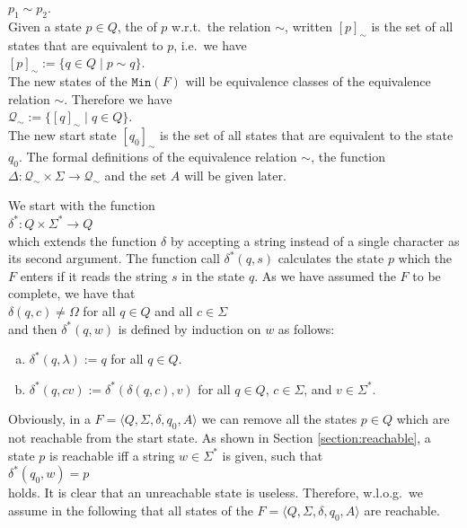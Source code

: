 $p_1 \sim p_2$.
\\[0.2cm]
Given a state $p \in Q$, the  of $p$ w.r.t.~the relation $\sim$, written $[p]_\sim$ is the set of all states that
are equivalent to $p$, i.e.~we have
\\[0.2cm]
\hspace*{1.3cm}
$[p]_\sim := \{ q \in Q \mid p \sim q \}$.
\\[0.2cm]
The new states of the  $\texttt{Min}(F)$ will be equivalence classes of the equivalence relation
$\sim$.  Therefore we have
\\[0.2cm]
\hspace*{1.3cm}
$\mathcal{Q}_\sim := \bigl\{ [q]_\sim \;\big|\; q \in Q \bigr\}$.
\\[0.2cm]
The new start state $[q_0]_\sim$ is the set of all states that are equivalent to the state $q_0$.  The formal definitions of the
equivalence relation $\sim$, the function $\Delta: \mathcal{Q}_\sim \times \Sigma \rightarrow \mathcal{Q}_\sim$
and the set $\widehat{A}$ will be given later.

We start with the function 
\\[0.2cm]
\hspace*{1.3cm}
$\delta^*: Q \times \Sigma^* \rightarrow Q$
\\[0.2cm]
which extends the function $\delta$ by accepting a string instead of a single character as its second argument.
The function call $\delta^*(q,s)$ calculates the state $p$ which the  $F$ enters if it reads the
string $s$ in the state $q$. As we have assumed the  $F$ to be complete, we have that
\\[0.2cm]
\hspace*{1.3cm}
$\delta(q, c) \not= \Omega$ \quad for all $q \in Q$ and all $c \in \Sigma$ 
\\[0.2cm]
and then $\delta^*(q,w)$ is defined by induction on $w$ as follows:
\begin{enumerate}[(a)]
\item $\delta^*(q, \lambda) := q$ \quad for all $q \in Q$.
\item $\delta^*(q, cv) := \delta^*(\delta(q, c), v)$ \quad for all $q \in Q$, $c \in \Sigma$, and $v \in \Sigma^*$.
\end{enumerate}

Obviously, in a 
$F = \langle Q, \Sigma, \delta, q_0, A \rangle$ we can remove all the states $p \in Q$ which are not
reachable from the start state.  As shown in Section \ref{section:reachable}, a state $p$ is reachable iff
a string $w \in \Sigma^*$ is given, such that
\\[0.2cm]
\hspace*{1.3cm}
$\delta^*(q_0, w) = p$
\\[0.2cm]
holds.  It is clear that an unreachable state is useless.  Therefore, w.l.o.g.~we assume in the following that all
states of the  $F =\langle Q, \Sigma, \delta, q_0, A \rangle$ are reachable.  


